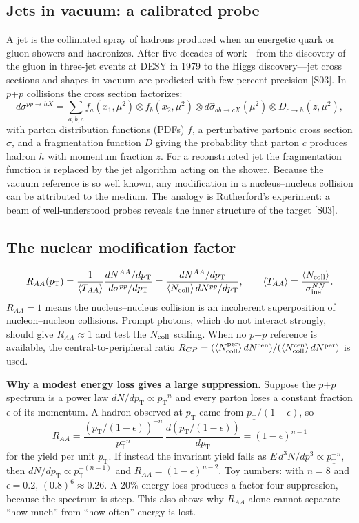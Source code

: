 \documentclass[11pt,letterpaper]{article}
\newcommand{\pT}{p_{\mathrm{T}}}
\newcommand{\RAA}{R_{AA}}
\begin{document}
\subsection{Jets in vacuum: a calibrated probe}
A jet is the collimated spray of hadrons produced when an energetic quark or gluon showers and hadronizes. After five
decades of work---from the discovery of the gluon in three-jet events at DESY in 1979 to the Higgs discovery---jet
cross sections and shapes in vacuum are predicted with few-percent precision [S03]. In $p$+$p$ collisions the
cross section factorizes:
\begin{equation}
d\sigma^{pp\to h X}=\sum_{a,b,c}f_a(x_1,\mu^2)\otimes f_b(x_2,\mu^2)\otimes d\hat\sigma_{ab\to cX}(\mu^2)\otimes D_{c\to h}(z,\mu^2),
\label{eq:fact}
\end{equation}
with parton distribution functions (PDFs) $f$, a perturbative partonic cross section $\hat\sigma$, and a fragmentation
function $D$ giving the probability that parton $c$ produces hadron $h$ with momentum fraction $z$. For a
reconstructed jet the fragmentation function is replaced by the jet algorithm acting on the shower. Because the
vacuum reference is so well known, any modification in a nucleus--nucleus collision can be attributed to the medium.
The analogy is Rutherford's experiment: a beam of well-understood probes reveals the inner structure of the target [S03].

\subsection{The nuclear modification factor}
\begin{equation}
\RAA(\pT)=\frac{1}{\langle T_{AA}\rangle}\frac{dN^{AA}/d\pT}{d\sigma^{pp}/d\pT}
=\frac{dN^{AA}/d\pT}{\langle N_{\rm coll}\rangle\,dN^{pp}/d\pT},\qquad \langle T_{AA}\rangle=\frac{\langle N_{\rm coll}\rangle}{\sigma^{NN}_{\rm inel}}.
\end{equation}
$\RAA=1$ means the nucleus--nucleus collision is an incoherent superposition of nucleon--nucleon collisions. Prompt
photons, which do not interact strongly, should give $\RAA\approx1$ and test the $N_{\rm coll}$ scaling. When no $p$+$p$
reference is available, the central-to-peripheral ratio $R_{CP}=(\langle N_{\rm coll}^{\rm per}\rangle\,dN^{\rm cen})/(\langle N_{\rm coll}^{\rm cen}\rangle\,dN^{\rm per})$ is used.

\textbf{Why a modest energy loss gives a large suppression.} Suppose the $p$+$p$ spectrum is a power law
$dN/d\pT\propto\pT^{-n}$ and every parton loses a constant fraction $\epsilon$ of its momentum. A hadron observed at
$\pT$ came from $\pT/(1-\epsilon)$, so
\begin{equation}
\RAA=\frac{(\pT/(1-\epsilon))^{-n}}{\pT^{-n}}\,\frac{d(\pT/(1-\epsilon))}{d\pT}=(1-\epsilon)^{n-1}
\end{equation}
for the yield per unit $\pT$. If instead the invariant yield falls as $E\,d^3N/dp^3\propto\pT^{-n}$, then
$dN/d\pT\propto\pT^{-(n-1)}$ and $\RAA=(1-\epsilon)^{n-2}$. Toy numbers: with $n=8$ and $\epsilon=0.2$,
$(0.8)^6\approx0.26$. A 20\% energy loss produces a factor four suppression, because the spectrum is steep. This also
shows why $\RAA$ alone cannot separate ``how much'' from ``how often'' energy is lost.
\end{document}
